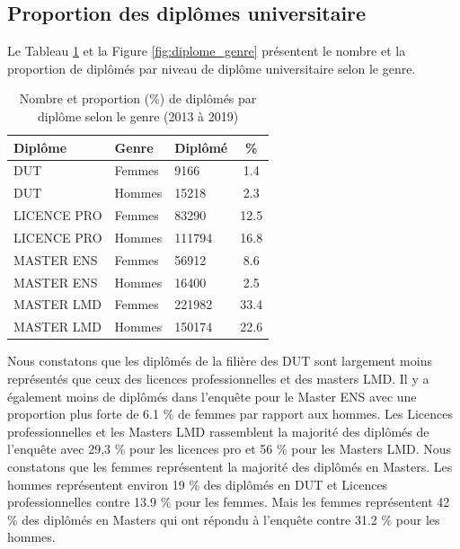 \documentclass[12pt, a4paper, titlepage, table]{article}
\begin{document}
	\subsection{Proportion des diplômes universitaire}
	Le Tableau \ref{tab:diplome_genre} et la Figure \ref{fig:diplome_genre} présentent le nombre et la proportion de diplômés par niveau de diplôme universitaire selon le genre. 
		\begin{table}[H]
			\centering
			\begin{tabular}{lllc}
				\toprule
				\textbf{Diplôme} & \textbf{Genre} & \textbf{Diplômé} & \textbf{\%} \\
				\midrule
				DUT & Femmes & 9166 & 1.4 \\
				DUT & Hommes & 15218 & 2.3 \\
				LICENCE PRO & Femmes & 83290 & 12.5 \\
				LICENCE PRO & Hommes & 111794 & 16.8 \\
				MASTER ENS & Femmes & 56912 & 8.6 \\
				MASTER ENS & Hommes & 16400 & 2.5 \\
				MASTER LMD & Femmes & 221982 & 33.4 \\
				MASTER LMD & Hommes & 150174 & 22.6 \\
				\bottomrule
			\end{tabular}
			\caption{Nombre et proportion (\%) de diplômés par diplôme selon le genre (2013 à 2019)}
			\label{tab:diplome_genre}
		\end{table}
	Nous constatons que les diplômés de la filière des DUT sont largement moins représentés que ceux des licences professionnelles et des masters LMD. Il y a également moins de diplômés dans l'enquête pour le Master ENS avec une proportion plus forte de 6.1 \% de femmes par rapport aux hommes.
	Les Licences professionnelles et les Masters LMD rassemblent la majorité des diplômés de l'enquête avec 29,3 \% pour les licences pro et 56 \% pour les Masters LMD.
	Nous constatons que les femmes représentent la majorité des diplômés en Masters. Les hommes représentent environ 19 \% des diplômés en DUT et Licences professionnelles contre 13.9 \% pour les femmes. Mais les femmes représentent 42 \% des diplômés en Masters qui ont répondu à l'enquête contre 31.2 \% pour les hommes.
\end{document}
